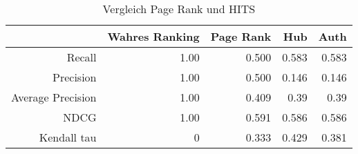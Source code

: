 % 

\begin{frame}[c]

\begin{table}
\begin{tabular}{r|r|r|r|r}
	 & \textbf{Wahres Ranking }& \textbf{Page Rank} & \textbf{Hub} & \textbf{Auth}
	 \\
	\hline
	Recall 				& 1.00 	& 0.500 & 0.583 & 0.583 \\
	Precision 			& 1.00 	& 0.500 & 0.146 & 0.146 \\
	Average Precision 	& 1.00 	& 0.409 & 0.39  & 0.39  \\
	NDCG 				& 1.00 	& 0.591 & 0.586 & 0.586 \\
	Kendall tau 		& 0		& 0.333 & 0.429 & 0.381 \\
\end{tabular}
\caption{Vergleich Page Rank und HITS}
\end{table}

\end{frame}